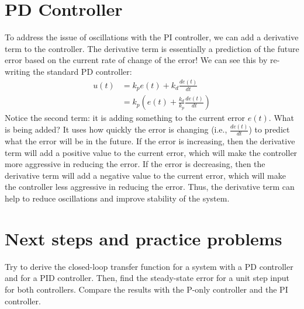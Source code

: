 \documentclass{ee122_notes}
\begin{document}
\section{PD Controller}
To address the issue of oscillations with the PI controller, we can add a derivative term to the controller. The derivative term is essentially a prediction of the future error based on the current rate of change of the error! We can see this by re-writing the standard PD controller:
\begin{align*}
    u(t) &= k_p e(t) + k_d \frac{de(t)}{dt} \\
    &= k_p (e(t) + \frac{k_d}{k_p} \frac{de(t)}{dt})
\end{align*}
Notice the second term: it is adding something to the current error $e(t)$. What is being added? It uses how quickly the error is changing (i.e., $\frac{de(t)}{dt}$) to predict what the error will be in the future. If the error is increasing, then the derivative term will add a positive value to the current error, which will make the controller more aggressive in reducing the error. If the error is decreasing, then the derivative term will add a negative value to the current error, which will make the controller less aggressive in reducing the error. Thus, the derivative term can help to reduce oscillations and improve stability of the system.

\section{Next steps and practice problems}
Try to derive the closed-loop transfer function for a system with a PD controller and for a PID controller. Then, find the steady-state error for a unit step input for both controllers. Compare the results with the P-only controller and the PI controller. 
\end{document}
